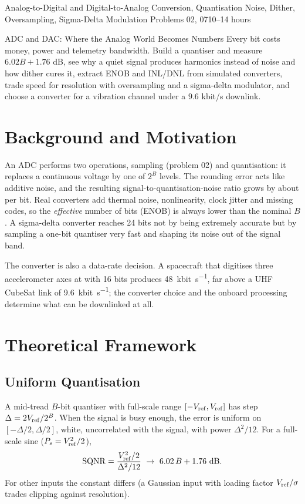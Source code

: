 \documentclass[11pt,a4paper]{article}
\begin{document}
%
{Analog-to-Digital and Digital-to-Analog Conversion, Quantisation Noise, Dither, Oversampling, Sigma-Delta Modulation}%
{Problems 02, 07}{10--14 hours}

\begin{summarybox}{ADC and DAC: Where the Analog World Becomes Numbers}
Every bit costs money, power and telemetry bandwidth. Build a quantiser and measure $6.02B+1.76$ dB, see why a quiet signal produces harmonics instead of noise and how dither cures it, extract ENOB and INL/DNL from simulated converters, trade speed for resolution with oversampling and a sigma-delta modulator, and choose a converter for a vibration channel under a $9.6$ kbit/s downlink.
\end{summarybox}


\section*{Background and Motivation}
An ADC performs two operations, sampling (problem 02) and quantisation: it replaces a continuous voltage by one of $2^B$ levels. The rounding error acts like additive noise, and the resulting signal-to-quantisation-noise ratio grows by about  per bit. Real converters add thermal noise, nonlinearity, clock jitter and missing codes, so the \emph{effective} number of bits (ENOB) is always lower than the nominal $B$. A sigma-delta converter reaches 24 bits not by being extremely accurate but by sampling a one-bit quantiser very fast and shaping its noise out of the signal band.

The converter is also a data-rate decision. A spacecraft that digitises three accelerometer axes at  with 16 bits produces \SI{48}{\kilo bit\per\second}, far above a UHF CubeSat link of \SI{9.6}{\kilo bit\per\second}; the converter choice and the onboard processing determine what can be downlinked at all.

\section*{Theoretical Framework}
\subsection{Uniform Quantisation}
A mid-tread $B$-bit quantiser with full-scale range $[-V_{\rm ref},V_{\rm ref}]$ has step $\Delta=2V_{\rm ref}/2^B$. When the signal is busy enough, the error is uniform on $[-\Delta/2,\Delta/2]$, white, uncorrelated with the signal, with power $\Delta^2/12$. For a full-scale sine ($P_s=V_{\rm ref}^2/2$),
\begin{equation}
  \mathrm{SQNR}=\frac{V_{\rm ref}^2/2}{\Delta^2/12}\ \to\ 6.02\,B+1.76\ \si{\decibel}.
  \label{eq:sqnr}
\end{equation}
For other inputs the constant differs (a Gaussian input with loading factor $V_{\rm ref}/\sigma$ trades clipping against resolution).
\end{document}
